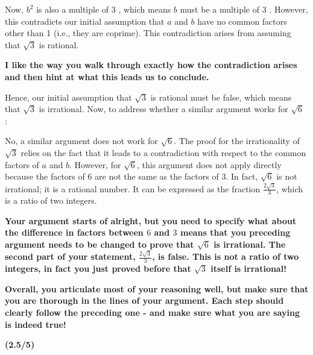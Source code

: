 \documentclass{report}
\begin{document}
Now, $b^{2}$ is also a multiple of 3 , which means $b$ must be a multiple of 3 . However, this contradicts our initial assumption that $a$ and $b$ have no common factors other than 1 (i.e., they are coprime). This contradiction arises from assuming that $\sqrt{3}$ is rational.

\textbf{
I like the way you walk through exactly how the contradiction arises and then hint at what this leads us to conclude.
}

Hence, our initial assumption that $\sqrt{3}$ is rational must be false, which means that $\sqrt{3}$ is irrational. Now, to address whether a similar argument works for $\sqrt{6}$ :

No, a similar argument does not work for $\sqrt{6}$. The proof for the irrationality of $\sqrt{3}$ relies on the fact that it leads to a contradiction with respect to the common factors of $a$ and $b$. However, for $\sqrt{6}$, this argument does not apply directly because the factors of 6 are not the same as the factors of 3. In fact, $\sqrt{6}$ is not irrational; it is a rational number. It can be expressed as the fraction $\frac{2 \sqrt{3}}{3}$, which is a ratio of two integers.

\textbf{
  Your argument starts of alright, but you need to specify what about the difference in factors between $6$ and $3$ means that you preceding argument needs to be changed to prove that $\sqrt{6}$ is irrational. The second part of your statement, $\frac{2\sqrt{3}}{3}$, is false. This is not a ratio of two integers, in fact you just proved before that $\sqrt{3}$ itself is irrational!  
}\par
\textbf{ 
Overall, you articulate most of your reasoning well, but make sure that you are thorough in the lines of your argument. Each step should clearly follow the preceding one - and make sure what you are saying is indeed true!
}\par\textbf{(2.5/5)}
\end{document}
